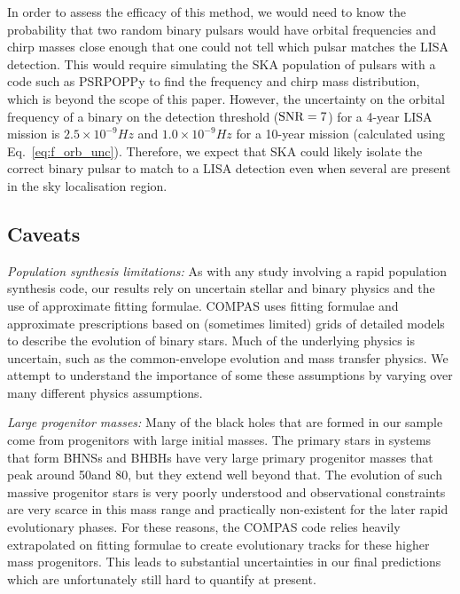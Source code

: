 In order to assess the efficacy of this method, we would need to know the probability that two random binary pulsars would have orbital frequencies and chirp masses close enough that one could not tell which pulsar matches the LISA detection. This would require simulating the SKA population of pulsars with a code such as PSRPOPPy \citep{Bates+2014} to find the frequency and chirp mass distribution, which is beyond the scope of this paper. However, the uncertainty on the orbital frequency of a binary on the detection threshold (${\rm SNR} = 7$) for a 4-year LISA mission is $2.5 \times 10^{-9} \unit{Hz}$ and $1.0 \times 10^{-9} \unit{Hz}$ for a 10-year mission (calculated using Eq.~\ref{eq:f_orb_unc}). Therefore, we expect that SKA could likely isolate the correct binary pulsar to match to a LISA detection even when several are present in the sky localisation region.

\subsection{Caveats}\label{sec:caveats}

\textit{Population synthesis limitations:} As with any study involving a rapid population synthesis code, our results rely on uncertain stellar and binary physics and the use of approximate fitting formulae. COMPAS uses fitting formulae and approximate prescriptions based on (sometimes limited) grids of detailed models to describe the evolution of binary stars. Much of the underlying physics is uncertain, such as the common-envelope evolution and mass transfer physics. We attempt to understand the importance of some these assumptions by varying over many different physics assumptions.

\textit{Large progenitor masses:} Many of the black holes that are formed in our sample come from progenitors with large initial masses. The primary stars in systems that form BHNSs and BHBHs have very large primary progenitor masses that peak around 50\Msun and 80\Msun, but they extend well beyond that. The evolution of such massive progenitor stars is very poorly understood and observational constraints are very scarce in this mass range and practically non-existent for the later rapid evolutionary phases. For these reasons, the COMPAS code relies heavily extrapolated on fitting formulae to create evolutionary tracks for these higher mass progenitors. This leads to substantial uncertainties in our final predictions which are unfortunately still hard to quantify at present.

